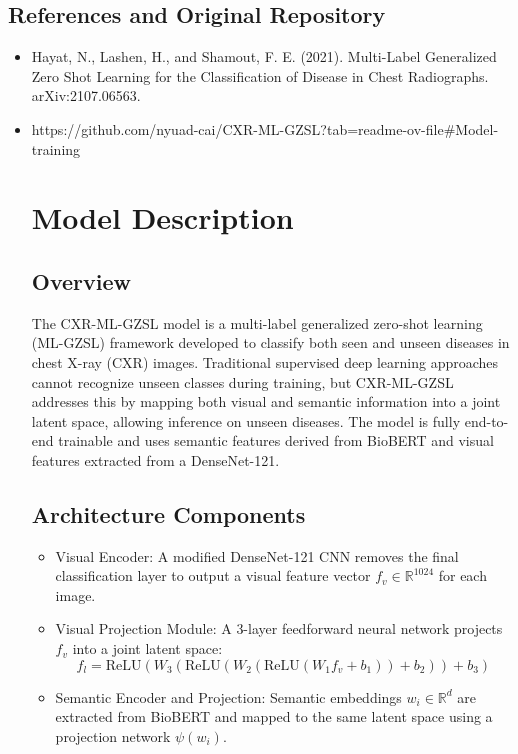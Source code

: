 \documentclass[letterpaper]{article} %
\begin{document}
\subsection{References and Original Repository}
\begin{itemize}
    \item Hayat, N., Lashen, H., and Shamout, F. E. (2021). Multi-Label Generalized Zero Shot Learning for the Classification of Disease in Chest Radiographs. arXiv:2107.06563.
    \item  https://github.com/nyuad-cai/CXR-ML-GZSL?tab=readme-ov-file#Model-training


\section{Model Description}

\subsection{Overview}

The CXR-ML-GZSL model is a multi-label generalized zero-shot learning (ML-GZSL) framework developed to classify both seen and unseen diseases in chest X-ray (CXR) images. Traditional supervised deep learning approaches cannot recognize unseen classes during training, but CXR-ML-GZSL addresses this by mapping both visual and semantic information into a joint latent space, allowing inference on unseen diseases. The model is fully end-to-end trainable and uses semantic features derived from BioBERT and visual features extracted from a DenseNet-121.

\subsection{Architecture Components}

\begin{itemize}
    \item Visual Encoder: A modified DenseNet-121 CNN removes the final classification layer to output a visual feature vector $f_v \in \mathbb{R}^{1024}$ for each image.
    
    \item Visual Projection Module: A 3-layer feedforward neural network projects $f_v$ into a joint latent space:
    \[
    f_l = \text{ReLU}(W_3 (\text{ReLU}(W_2(\text{ReLU}(W_1 f_v + b_1)) + b_2)) + b_3)
    \]
    
    \item Semantic Encoder and Projection: Semantic embeddings $w_i \in \mathbb{R}^d$ are extracted from BioBERT and mapped to the same latent space using a projection network $\psi(w_i)$.
    

\end{itemize}
\end{itemize}
\end{document}
